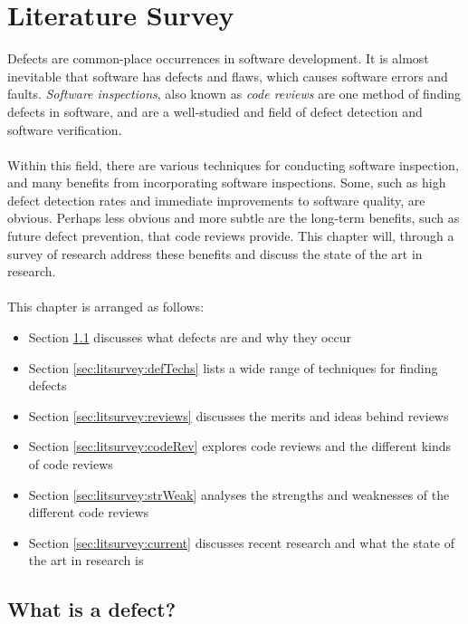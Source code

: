 \chapter{Literature Survey} \label{chapter:litsurvey}

Defects are common-place occurrences in software development.
It is almost inevitable that software has defects and flaws, which causes software errors and
faults.
{\em Software inspections}, also known as {\em code reviews} are one method of finding defects in
software, and are a well-studied and field of defect detection and software verification.\\
\\
Within this field, there are various techniques for conducting software inspection, and many
benefits from incorporating software inspections.
Some, such as high defect detection rates and immediate improvements to software quality, are
obvious.
Perhaps less obvious and more subtle are the long-term benefits, such as future
defect prevention, that code reviews provide.
This chapter will, through a survey of research address these benefits and discuss the state of the
art in research.\\
\\
This chapter is arranged as follows:
\begin{itemize}
	\item Section \ref{sec:litsurvey:defect} discusses what defects are and why they occur
	\item Section \ref{sec:litsurvey:defTechs} lists a wide range of techniques for finding defects
	\item Section \ref{sec:litsurvey:reviews} discusses the merits and ideas behind reviews
	\item Section \ref{sec:litsurvey:codeRev} explores code reviews and the different kinds of code
		reviews
	\item Section \ref{sec:litsurvey:strWeak} analyses the strengths and weaknesses of the different
		code reviews
	\item Section \ref{sec:litsurvey:current} discusses recent research and what the state of the art
		in research is
\end{itemize}

\section{What is a defect?} \label{sec:litsurvey:defect}

